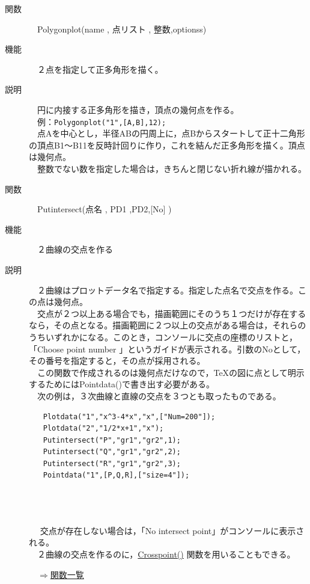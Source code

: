 \documentclass[papersize,a4paper,12pt,uplatex]{jsarticle}
\begin{document}
\begin{description}
\hypertarget{polygonplot}{}
\item[関数]　Polygonplot(name , 点リスト , 整数,optionss)
\item[機能]　２点を指定して正多角形を描く。
\item[説明]　円に内接する正多角形を描き，頂点の幾何点を作る。\\
　例：\verb|Polygonplot("1",[A,B],12);|\\
　点Aを中心とし，半径ABの円周上に，点Bからスタートして正十二角形の頂点B1〜B11を反時計回りに作り，これを結んだ正多角形を描く。頂点は幾何点。\\
　整数でない数を指定した場合は，きちんと閉じない折れ線が描かれる。\\


\hypertarget{putintersect}{}
\item[関数]　Putintersect(点名 , PD1 ,PD2,[No] )
\item[機能]　２曲線の交点を作る
\item[説明]　２曲線はプロットデータ名で指定する。指定した点名で交点を作る。この点は幾何点。\\
　交点が２つ以上ある場合でも，描画範囲にそのうち１つだけが存在するなら，その点となる。描画範囲に２つ以上の交点がある場合は，それらのうちいずれかになる。このとき，コンソールに交点の座標のリストと，「Choose point number 」というガイドが表示される。引数のNoとして，その番号を指定すると，その点が採用される。\\
　この関数で作成されるのは幾何点だけなので，\TeX の図に点として明示するためにはPointdata()で書き出す必要がある。\\
　次の例は，３次曲線と直線の交点を３つとも取ったものである。
\begin{verbatim}
　　Plotdata("1","x^3-4*x","x",["Num=200"]);
　　Plotdata("2","1/2*x+1","x");
　　Putintersect("P","gr1","gr2",1);
　　Putintersect("Q","gr1","gr2",2);
　　Putintersect("R","gr1","gr2",3);
　　Pointdata("1",[P,Q,R],["size=4"]);
\end{verbatim}
　\\
 　　　　　　　　　　\\
 　\\
　 交点が存在しない場合は，「No intersect point」がコンソールに表示される。\\
　２曲線の交点を作るのに，\hyperlink{crosspoint}{Crosspoint()} 関数を用いることもできる。\\
\begin{flushright}　\hyperlink{functionlist}{$\Rightarrow$関数一覧}\end{flushright}



\end{description}
\end{document}
